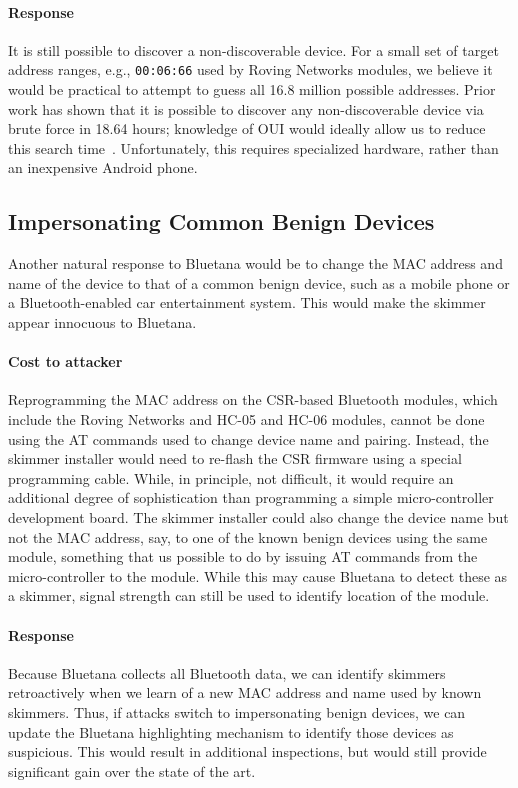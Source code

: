 \paragraph{Response} It is still possible to discover a non-discoverable device.
%
For a small set of target address ranges, e.g., \texttt{00:06:66} used by Roving Networks modules, we believe it
would be practical to attempt to guess all 16.8 million possible addresses.
%
Prior work has shown that it is possible to discover any non-discoverable device via brute force in 18.64 hours;
knowledge of OUI would ideally allow us to reduce this search time~\cite{cross2007detecting}.
%
Unfortunately, this requires specialized hardware, rather than an inexpensive Android phone.

\subsection{Impersonating Common Benign Devices}
Another natural response to Bluetana would be to change the MAC address and name of the device to that of a common
benign device, such as a mobile phone or a Bluetooth-enabled car entertainment system. This would make the skimmer
appear innocuous to Bluetana.

\paragraph{Cost to attacker} Reprogramming the MAC address on the CSR-based Bluetooth modules, which include the
Roving Networks and HC-05 and HC-06 modules, cannot be done using the AT commands used to change device name and
pairing. Instead, the skimmer installer would need to re-flash the CSR firmware using a special programming cable.
While, in principle, not difficult, it would require an additional degree of sophistication than programming a simple
micro-controller development board. The skimmer installer could also change the device name but not the MAC address,
say, to one of the known benign devices using the same module, something that us possible to do by issuing AT
commands from the micro-controller to the module. While this may cause Bluetana to detect these as a skimmer, signal strength can still be used to identify location of the module.

\paragraph{Response} Because Bluetana collects all Bluetooth data, we can identify skimmers retroactively when we
learn of a new MAC address and name used by known skimmers. Thus, if attacks switch to impersonating benign devices,
we can update the Bluetana highlighting mechanism to identify those devices as suspicious. This would result in
additional inspections, but would still provide significant gain over the state of the art.

